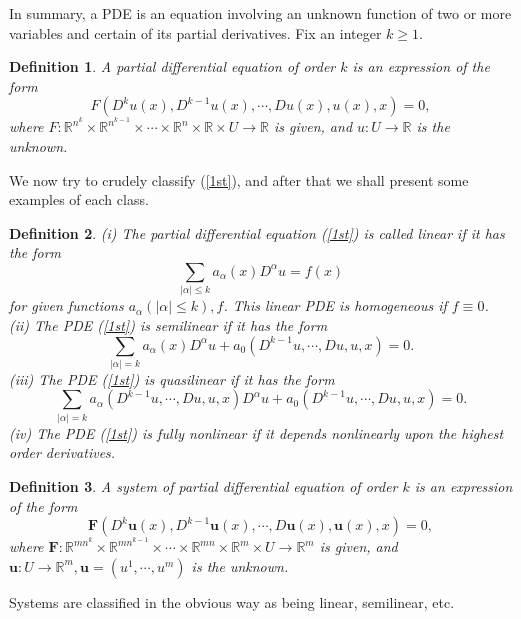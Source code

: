 \documentclass[hyperref,UTF8,12pt]{article}
\numberwithin{equation}{subsection}
\theoremstyle{plain}
\newtheorem{definition}{Definition}
\theoremstyle{definition}
\numberwithin{theorem}{section}
\numberwithin{lemma}{section}
\numberwithin{proposition}{section}
\numberwithin{remark}{section}
\numberwithin{corollary}{section}
\numberwithin{definition}{section}
\numberwithin{problem}{section}
\numberwithin{example}{section}
\newcommand{\mr}{\mathbb{R}}
\renewcommand{\leq}{\leqslant}
\renewcommand{\geq}{\geqslant}
\begin{document}
In summary, a PDE is an equation involving an unknown function of two or more variables and certain of its partial derivatives. Fix an integer $k\geq1$.
\begin{definition}
A \emph{partial differential equation} of \emph{order} $k$ is an expression of the form
\begin{equation}
\label{1st}\tag{1}F(D^ku(x),D^{k-1}u(x),\cdots,Du(x),u(x),x)=0,
\end{equation}
where $F:\mr^{n^k}\times\mr^{n^{k-1}}\times\cdots\times\mr^n\times\mr\times U \to\mr$ is given, and $u:U\to\mr$ is the unknown.
\end{definition}
We now try to crudely classify (\ref{1st}), and after that we shall present some examples of each class.
\begin{definition}
\textup{(i)} The partial differential equation \textup{(\ref{1st})} is called \emph{linear} if it has the form
\[\sum_{|\alpha|\leq k}a_\alpha(x)D^\alpha u=f(x)\]
for given functions $a_\alpha(|\alpha|\leq k), f$. This linear PDE is \emph{homogeneous} if $f \equiv 0$.\\
\textup{(ii)} The PDE \textup{(\ref{1st})} is \emph{semilinear} if it has the form
\[\sum_{|\alpha|=k}a_\alpha(x)D^\alpha u+a_0(D^{k-1}u,\cdots,Du,u,x)=0.\]
\textup{(iii)} The PDE \textup{(\ref{1st})} is \emph{quasilinear} if it has the form\[
\sum_{|\alpha|=k}a_\alpha(D^{k-1}u,\cdots,Du,u,x)D^\alpha u+a_0(D^{k-1}u,\cdots,Du,u,x)=0.\]
\textup{(iv)} The PDE \textup{(\ref{1st})} is \emph{fully nonlinear} if it depends nonlinearly upon the highest order derivatives.
\end{definition}
\begin{definition}
A \emph{system of partial differential equation} of \emph{order} $k$ is an expression of the form
\begin{equation}
	\label{2nd}\tag{2}\mathbf{F}(D^k\mathbf{u}(x),D^{k-1}\mathbf{u}(x),\cdots,D\mathbf{u}(x),\mathbf{u}(x),x)=0,
\end{equation}
where $\mathbf{F}:\mr^{mn^k}\times\mr^{mn^{k-1}}\times\cdots\times\mr^{mn}\times\mr^m\times U\to\mr^m$ is given, and $\mathbf{u}:U\to\mr^m,\mathbf{u}=(u^1,\cdots,u^m)$ is the unknown.
\end{definition}
Systems are classified in the obvious way as being linear, semilinear, etc.
\end{document}
